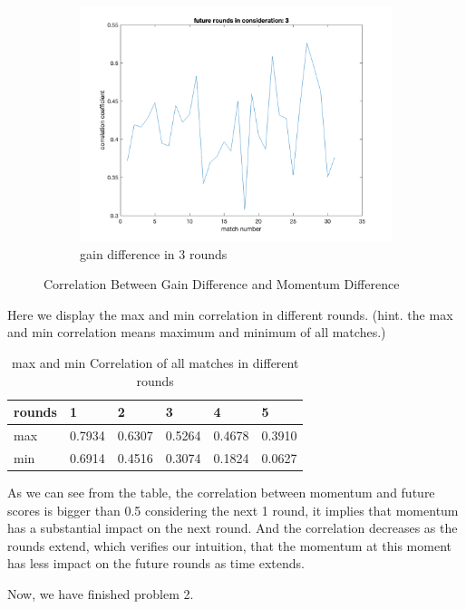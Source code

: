 \begin{figure}[H]
    \begin{subfigure}[b]{0.34\textwidth}
        \includegraphics[width=\linewidth]{mainmatter/photos/momen_3points_cor.png}
        \caption{gain difference in 3 rounds}
    \end{subfigure}
    \caption{Correlation Between Gain Difference and Momentum Difference}
    \label{fig:Correlation}
\end{figure}

Here we display the max and min correlation in different rounds.
(hint. the max and min correlation means maximum and minimum of all matches.)

\begin{table}[!ht]
    \centering
    \begin{tabular}{|l|l|l|l|l|l|}
    \hline
        rounds & 1 & 2 & 3 & 4 & 5 \\ \hline
        max & 0.7934 & 0.6307 & 0.5264 & 0.4678 & 0.3910 \\ \hline
        min & 0.6914 & 0.4516 & 0.3074 & 0.1824 & 0.0627 \\ \hline
    \end{tabular}
    \caption{max and min Correlation of all matches in different rounds}
    \label{fig:maxmin Correlation}
\end{table}

As we can see from the table, the correlation between momentum and future scores is bigger
than 0.5 considering the next 1 round, it implies that momentum has a substantial impact on the next round.
And the correlation decreases as the rounds extend, which verifies our intuition, that
the momentum at this moment has less impact on the future rounds as time extends.

Now, we have finished problem 2.
